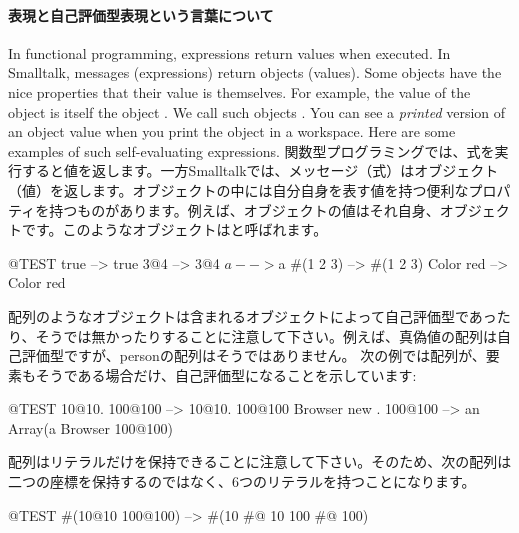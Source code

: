 \documentclass[a4paper,10pt,twoside]{book}
\begin{document}
\paragraph{表現と自己評価型表現という言葉について}
In functional programming, expressions return values when executed. In Smalltalk, messages (expressions) return objects (values). Some objects have the nice properties that their value is themselves. For example, the value of the object  is itself \ie the object . We call such objects . You can see a \emph{printed} version of an object value when you print the object in a workspace. Here are some examples of such self-evaluating expressions. 
関数型プログラミングでは、式を実行すると値を返します。一方Smalltalkでは、メッセージ（式）はオブジェクト（値）を返します。オブジェクトの中には自分自身を表す値を持つ便利なプロパティを持つものがあります。例えば、オブジェクトの値はそれ自身、オブジェクトです。このようなオブジェクトはと呼ばれます。

\begin{code}{@TEST}
true         --> true
3@4       --> 3@4
$a           --> $a
#(1 2 3)   --> #(1 2 3)
Color red --> Color red
\end{code}

配列のようなオブジェクトは含まれるオブジェクトによって自己評価型であったり、そうでは無かったりすることに注意して下さい。例えば、真偽値の配列は自己評価型ですが、personの配列はそうではありません。
次の例では配列が、要素もそうである場合だけ、自己評価型になることを示しています:
\begin{code}{@TEST}
{10@10. 100@100}           --> {10@10. 100@100}
{Browser new . 100@100} --> an Array(a Browser 100@100)
\end{code}

配列はリテラルだけを保持できることに注意して下さい。そのため、次の配列は二つの座標を保持するのではなく、6つのリテラルを持つことになります。
\begin{code}{@TEST}
#(10@10 100@100) --> #(10 #@ 10 100 #@ 100)
\end{code}
\end{document}
